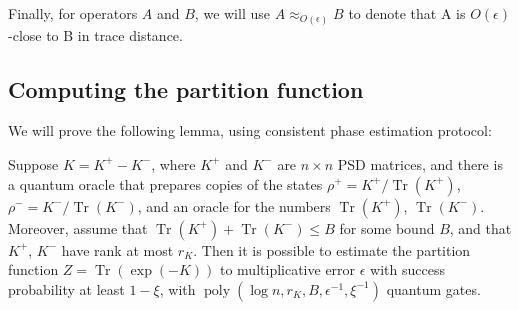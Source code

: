 \documentclass[a4paper,UKenglish,cleveref, autoref]{lipics-v2019}
\theoremstyle{remark}
\numberwithin{equation}{section}
\numberwithin{oracle}{section}
\numberwithin{remark}{section}
\DeclareMathOperator{\poly}{poly}
\DeclareMathOperator{\tr}{Tr}
\begin{document}
Finally, for operators $A$ and $B$, we will use $A\approx_{O(\epsilon)}B$ to denote that A is $O(\epsilon)$-close to B in trace distance.

\subsection{Computing the partition function}
We will prove the following lemma, using consistent phase estimation protocol:
\begin{lemma} \label{lem:app:partition}
Suppose $K = K^+ - K^-$, where $K^+$ and $K^-$ are $n \times n$ PSD matrices, and there is a quantum oracle that prepares copies of the states $\rho^+=K^+ / \tr(K^+)$, $\rho^- = K^-/ \tr(K^-)$, and an oracle for the numbers $\tr(K^+)$, $\tr(K^-)$. Moreover, assume that $\tr(K^+) + \tr(K^-) \le B$ for some bound $B$, and that $K^+$, $K^-$ have rank at most $r_{K}$. Then it is possible to estimate the partition function $Z=\tr(\exp(-K))$ to multiplicative error $\epsilon$ with success probability at least $1-\xi$, with $\poly(\log n, r_{K}, B, \epsilon^{-1}, \xi^{-1})$ quantum gates.
\end{lemma}
\end{document}
